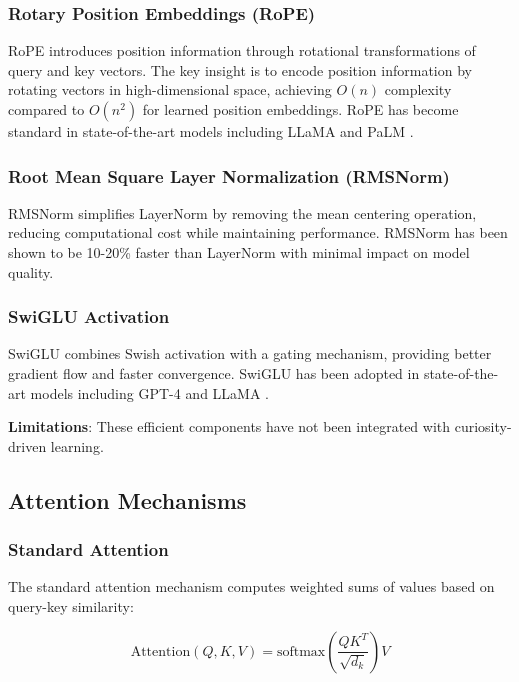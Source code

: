 \documentclass{IEEEtran}
\begin{document}
\subsubsection{Rotary Position Embeddings (RoPE)}

RoPE \cite{su2021} introduces position information through rotational transformations of query and key vectors. The key insight is to encode position information by rotating vectors in high-dimensional space, achieving $O(n)$ complexity compared to $O(n^2)$ for learned position embeddings. RoPE has become standard in state-of-the-art models including LLaMA \cite{touvron2023} and PaLM \cite{anil2023}.

\subsubsection{Root Mean Square Layer Normalization (RMSNorm)}

RMSNorm \cite{zhang2019} simplifies LayerNorm by removing the mean centering operation, reducing computational cost while maintaining performance. RMSNorm has been shown to be 10-20\% faster than LayerNorm with minimal impact on model quality.

\subsubsection{SwiGLU Activation}

SwiGLU \cite{shazeer2020} combines Swish activation with a gating mechanism, providing better gradient flow and faster convergence. SwiGLU has been adopted in state-of-the-art models including GPT-4 \cite{openai2023} and LLaMA \cite{touvron2023}.

\textbf{Limitations}: These efficient components have not been integrated with curiosity-driven learning.

\subsection{Attention Mechanisms}

\subsubsection{Standard Attention}

The standard attention mechanism \cite{vaswani2017} computes weighted sums of values based on query-key similarity:

\begin{equation}
\text{Attention}(Q, K, V) = \text{softmax}\left(\frac{QK^T}{\sqrt{d_k}}\right) V
\end{equation}
\end{document}
